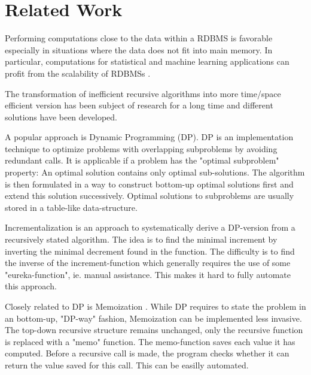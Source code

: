 \section{Related Work}

Performing computations close to the data within a RDBMS is favorable especially in situations where the data does not fit into main memory. In particular, computations for statistical and machine learning applications can profit from the scalability of RDBMSs \cite{SQLforML,PCAinSQL,MLwithUDFs,MLinSQL2,decisionTables}.

The transformation of inefficient recursive algorithms into more time/space efficient version has been subject of research for a long time and different solutions have been developed.

A popular approach is Dynamic Programming (DP). DP is an implementation technique to optimize problems with overlapping subproblems by avoiding redundant calls. It is applicable if a problem has the "optimal subproblem" property: An optimal solution contains only optimal sub-solutions. The algorithm is then formulated in a way to construct bottom-up optimal solutions first and extend this solution successively. Optimal solutions to subproblems are usually stored in a table-like data-structure. \cite{DP_Bellman}

Incrementalization is an approach to systematically derive a DP-version from a recursively stated algorithm. The idea is to find the minimal increment by inverting the minimal decrement found in the function. The difficulty is to find the inverse of the increment-function which generally requires the use of some "eureka-function", ie. manual assistance. This makes it hard to fully automate this approach. \cite{incrementalization}

Closely related to DP is Memoization \cite{memo}. While DP requires to state the problem in an bottom-up, "DP-way" fashion, Memoization can be implemented less invasive. The top-down recursive structure remains unchanged, only the recursive function is replaced with a "memo" function. The memo-function saves each value it has computed. Before a recursive call is made, the program checks whether it can return the value saved for this call. This can be easilly automated. \cite{norvig_memoization}

